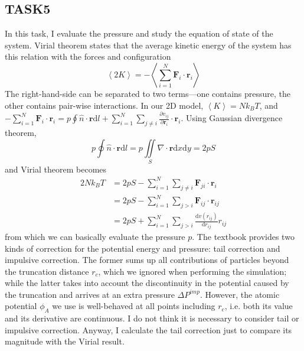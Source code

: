 \documentclass[letterpaper,12pt]{article}
\numberwithin{equation}{section}
\begin{document}
\subsection{TASK5}
In this task, I evaluate the pressure and study the equation of state of the system. Virial theorem states that the average kinetic energy of the system has this relation with the forces and configuration
\begin{equation}
    \left\langle 2K\right\rangle=-\left\langle \sum\limits_{i=1}^N{\boldsymbol{F}_i\cdot\boldsymbol{r}_i}\right\rangle
\end{equation}
The right-hand-side can be separated to two terms---one contains pressure, the other contains pair-wise interactions. In our 2D model, $\left\langle K\right\rangle=Nk_BT$, and $-\sum\limits_{i=1}^N{\boldsymbol{F}_i\cdot\boldsymbol{r}_i}=p\oint{\hat{n}\cdot\boldsymbol{r}\mathrm{d}l}+\sum\limits_{i=1}^N{\sum\limits_{j\neq i}{\frac{\partial v_{ij}}{\partial \boldsymbol{r}_i}\cdot\boldsymbol{r}_i}}$. Using Gaussian divergence theorem, 
\begin{equation}                         p\oint{\hat{n}\cdot\boldsymbol{r}\mathrm{d}l}=p\iint\limits_S{\nabla\cdot\boldsymbol{r}\mathrm{d}x\mathrm{d}y}=2pS
\end{equation}
and Virial theorem becomes 
\begin{equation}
    \label{Eq:virial}
    \begin{aligned}
        2Nk_BT&=2pS-\sum\limits_{i=1}^N{\sum\limits_{j\neq i}{\boldsymbol{F}_{ji}\cdot\boldsymbol{r}_i}} \\
        &=2pS-\sum\limits_{i=1}^N{\sum\limits_{j>i}{\boldsymbol{F}_{ij}\cdot\boldsymbol{r}_{ij}}} \\
        &=2pS+\sum\limits_{i=1}^N{\sum\limits_{j>i}{\frac{\mathrm{d}v(r_{ij})}{\mathrm{d}r_{ij}}{r}_{ij}}}
    \end{aligned}
\end{equation}
from which we can basically evaluate the pressure $p$. The textbook \cite{UMS} provides two kinds of correction for the potential energy and pressure: tail correction and impulsive correction. The former sums up all contributions of particles beyond the truncation distance $r_c$, which we ignored when performing the simulation; while the latter takes into account the discontinuity in the potential caused by the truncation and arrives at an extra pressure $\Delta P^{imp}$. However, the atomic potential $\phi_A$ we use is well-behaved at all points including $r_c$, i.e. both its value and its derivative are continuous. I do not think it is necessary to consider tail or impulsive correction. Anyway, I calculate the tail correction just to compare its magnitude with the Virial result. 
\end{document}
